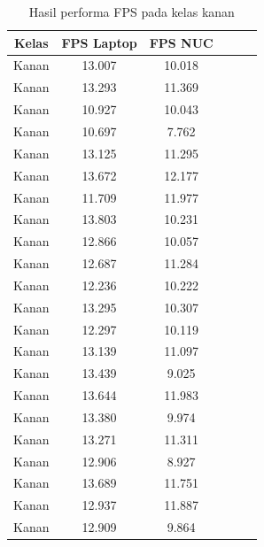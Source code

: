 \begin{longtable}{|c|c|c|c|c|c|}
  \caption{Hasil performa FPS pada kelas kanan}
  \label{tb:fpskanan} \\
  \hline
  \rowcolor[HTML]{C0C0C0} 
  \textbf{Kelas} & \textbf{FPS Laptop} & \textbf{FPS NUC} \\ \hline
  Kanan          & 13.007              & 10.018           \\ \hline
  Kanan          & 13.293              & 11.369           \\ \hline
  Kanan          & 10.927              & 10.043           \\ \hline
  Kanan          & 10.697              & 7.762            \\ \hline
  Kanan          & 13.125              & 11.295           \\ \hline
  Kanan          & 13.672              & 12.177           \\ \hline
  Kanan          & 11.709              & 11.977           \\ \hline
  Kanan          & 13.803              & 10.231           \\ \hline
  Kanan          & 12.866              & 10.057           \\ \hline
  Kanan          & 12.687              & 11.284           \\ \hline
  Kanan          & 12.236              & 10.222           \\ \hline
  Kanan          & 13.295              & 10.307           \\ \hline
  Kanan          & 12.297              & 10.119           \\ \hline
  Kanan          & 13.139              & 11.097           \\ \hline
  Kanan          & 13.439              & 9.025            \\ \hline
  Kanan          & 13.644              & 11.983           \\ \hline
  Kanan          & 13.380              & 9.974            \\ \hline
  Kanan          & 13.271              & 11.311           \\ \hline
  Kanan          & 12.906              & 8.927            \\ \hline
  Kanan          & 13.689              & 11.751           \\ \hline
  Kanan          & 12.937              & 11.887           \\ \hline
  Kanan          & 12.909              & 9.864            \\ \hline

\end{longtable}
